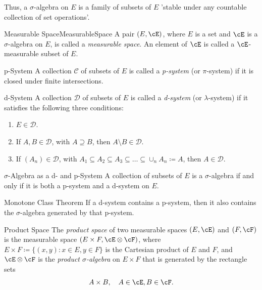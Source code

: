 Thus, a \(\sigma\)-algebra on \(E\) is a family of subsets of \(E\) 'stable under any countable collection of set operations'.

\begin{defn}{Measurable Space}{MeasurableSpace}
	A pair \((E, \cE)\), where \(E\) is a set and \(\cE\) is a \(\sigma\)-algebra on \(E\), is called a \textit{measurable space}. An element of \(\cE\) is called a \(\cE\)-measurable subset of \(E\).
\end{defn}

\begin{defn}{p-System}{}
	A collection \(\mathcal{C}\) of subsets of \(E\) is called a \textit{p-system} (or \(\pi\)-system) if it is closed under finite intersections.
\end{defn}

\begin{defn}{d-System}{}
	A collection \(\mathcal{D}\) of subsets of \(E\) is called a \textit{d-system} (or \(\lambda\)-system) if it satisfies the following three conditions:
	\begin{enumerate}
		\item \(E \in \mathcal{D}\).
		\item If \(A, B \in \mathcal{D}\), with \(A \supseteq B\), then \(A \setminus B \in \mathcal{D}\).
		\item If \((A_n) \in \mathcal{D}\), with \(A_1 \subseteq A_2 \subseteq A_3 \subseteq \dots \subseteq \cup_n A_n \coloneqq A\), then \(A \in \mathcal{D}\).
	\end{enumerate}
\end{defn}

\begin{thm}{\(\sigma\)-Algebra as a d- and p-System}{}
	A collection of subsets of \(E\) is a \(\sigma\)-algebra if and only if it is both a p-system and a d-system on \(E\).
\end{thm}

\begin{thm}{Monotone Class Theorem}{}
	If a d-system contains a p-system, then it also contains the \(\sigma\)-algebra generated by that p-system.
\end{thm}

\begin{defn}{Product Space}{}
	The \textit{product space} of two measurable spaces \((E, \cE)\) and \((F, \cF)\) is the measurable space \((E \times F, \cE \otimes \cF)\), where \(E \times F \coloneqq \{(x, y) : x \in E, y \in F\}\) is the Cartesian product of \(E\) and \(F\), and \(\cE \otimes \cF\) is the \textit{product \(\sigma\)-algebra} on \(E \times F\) that is generated by the rectangle sets
	\begin{equation*}
		A \times B, \quad A \in \cE, B \in \cF.
	\end{equation*}
\end{defn}

